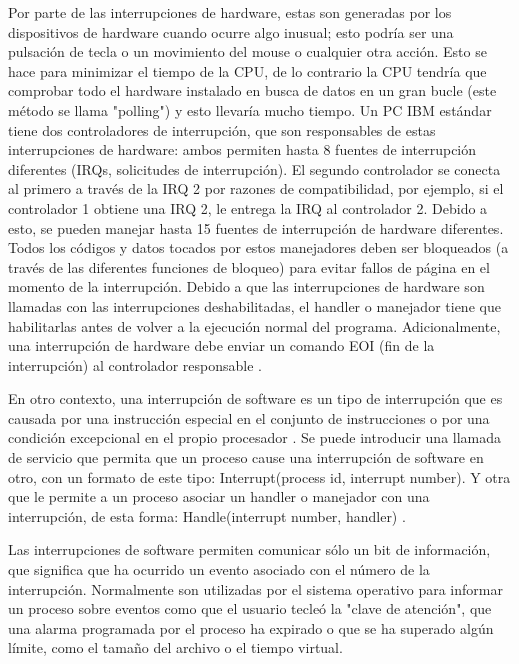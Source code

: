 \documentclass[12pt]{article}
\begin{document}
{Por parte de las interrupciones de hardware, estas son generadas por los dispositivos de hardware cuando ocurre algo inusual; esto podría ser una pulsación de tecla o un movimiento del mouse o cualquier otra acción. Esto se hace para minimizar el tiempo de la CPU, de lo contrario la CPU tendría que comprobar todo el hardware instalado en busca de datos en un gran bucle (este método se llama "polling") y esto llevaría mucho tiempo. Un PC IBM estándar tiene dos controladores de interrupción, que son responsables de estas interrupciones de hardware: ambos permiten hasta 8 fuentes de interrupción diferentes (IRQs, solicitudes de interrupción). El segundo controlador se conecta al primero a través de la IRQ 2 por razones de compatibilidad, por ejemplo, si el controlador 1 obtiene una IRQ 2, le entrega la IRQ al controlador 2. Debido a esto, se pueden manejar hasta 15 fuentes de interrupción de hardware diferentes. Todos los códigos y datos tocados por estos manejadores deben ser bloqueados (a través de las diferentes funciones de bloqueo) para evitar fallos de página en el momento de la interrupción. Debido a que las interrupciones de hardware son llamadas con las interrupciones deshabilitadas, el handler o manejador tiene que habilitarlas antes de volver a la ejecución normal del programa. Adicionalmente, una interrupción de hardware debe enviar un comando EOI (fin de la interrupción) al controlador responsable \citep{Hard}.
\newline

En otro contexto, una interrupción de software es un tipo de interrupción que es causada por una instrucción especial en el conjunto de instrucciones o por una condición excepcional en el propio procesador \citep{Softtech}. Se puede introducir una llamada de servicio que permita que un proceso cause una interrupción de software en otro, con un formato de este tipo: Interrupt(process id, interrupt number). Y otra que le permite a un proceso asociar un handler o manejador con una interrupción, de esta forma: Handle(interrupt number, handler) \citep{Softm}.
\newline

Las interrupciones de software permiten comunicar sólo un bit de información, que significa que ha ocurrido un evento asociado con el número de la interrupción. Normalmente son utilizadas por el sistema operativo para informar un proceso sobre eventos como que el usuario tecleó la "clave de atención", que una alarma programada por el proceso ha expirado o que se ha superado algún límite, como el tamaño del archivo o el tiempo virtual.
\newline

}
\end{document}
